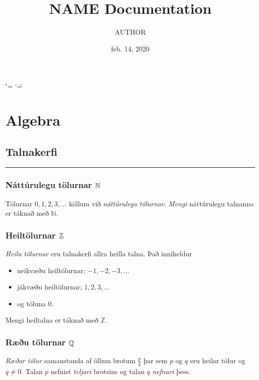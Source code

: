 \documentclass[a4paper,10pt,icelandic]{sphinxmanual}
\title{NAME Documentation}
\date{feb. 14, 2020}
\author{AUTHOR}
\begin{document}
\ifdefined\shorthandoff
  \ifnum\catcode`\=\string=\active\shorthandoff{=}\fi
  \ifnum\catcode`\"=\active{}\fi
\fi

\pagestyle{empty}
\sphinxmaketitle
\pagestyle{plain}
\sphinxtableofcontents
\pagestyle{normal}
\label{\detokenize{index::doc}}



\chapter{Algebra}
\label{\detokenize{Kafli01:algebra}}\label{\detokenize{Kafli01::doc}}

\section{Talnakerfi}
\label{\detokenize{Kafli01:talnakerfi}}

\bigskip\hrule\bigskip



\subsection{Náttúrulegu tölurnar  \protect\(\mathbb{N}\protect\)}
\label{\detokenize{Kafli01:natturulegu-tolurnar-mathbb-n}}
Tölurnar \(0,1,2,3, \dots\) köllum við \textit{náttúrulegu tölurnar}. \textit{Mengi} náttúrulegu talnanna er táknað með \(\mathbb{N}.\)


\subsection{Heiltölurnar \protect\(\mathbb{Z}\protect\)}
\label{\detokenize{Kafli01:heiltolurnar-mathbb-z}}
\textit{Heilu tölurnar} eru talnakerfi allra heilla talna. Það inniheldur
\begin{itemize}
\item {} 
neikvæðu heiltölurnar; \(-1,-2,-3, \dots\)

\item {} 
jákvæðu heiltölurnar; \(1,2,3, \dots\)

\item {} 
og töluna \(0\).

\end{itemize}

Mengi heiltalna er táknað með \(\mathbb{Z}\).


\subsection{Ræðu tölurnar \protect\(\mathbb{Q}\protect\)}
\label{\detokenize{Kafli01:raeu-tolurnar-mathbb-q}}
\textit{Ræðar tölur} samanstanda af öllum brotum \(\frac{p}{q}\) þar sem \(p\) og \(q\) eru heilar tölur og \(q \neq 0\). Talan \(p\) nefnist \textit{teljari} brotsins og talan \(q\) \textit{nefnari} þess.
\end{document}
